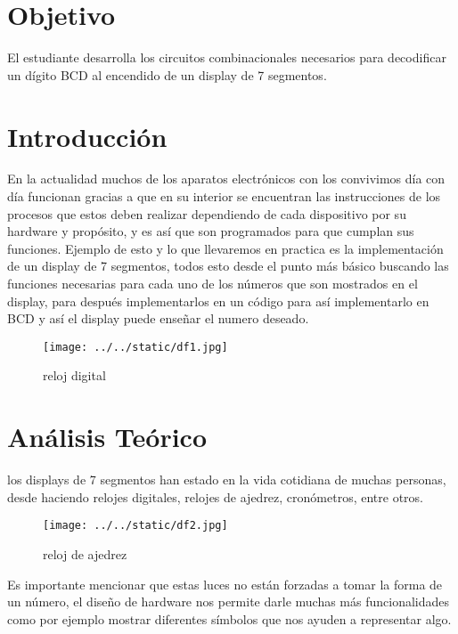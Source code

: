\documentclass{article}
\begin{document}
\begin{abstract}
	\begin{justify}
		Se programo un display de 7 segmentos en una tarjeta de desarrollo FPGADE10 para que nos mostrase los números decimales siendo los inputs (entradas) los switches que se tienen en la tarjeta de tal manera que representen los numeros binarios y la traducción de estos queden plasmados en el display de 7 segmentos.	
		\end{justify}
{\it Keywords:}   diseño de hardware, display de siete segmentos  
\end{abstract}
\begin{multicols}{2}
\section{Objetivo}\label{Objetivo}
El estudiante desarrolla los circuitos combinacionales necesarios para decodificar un dígito BCD al encendido de un display de 7 segmentos.	
\section{Introducción}\label{sec:intro}
En la actualidad muchos de los aparatos electrónicos con los convivimos día con día funcionan gracias a que en su interior se encuentran las instrucciones de los procesos que estos deben realizar dependiendo de cada dispositivo por su hardware y propósito, y es así que son programados para que cumplan sus funciones. Ejemplo de esto y lo que llevaremos en practica es la implementación de un display de 7 segmentos, todos esto desde el punto más básico buscando las funciones necesarias para cada uno de los números que son mostrados en el display, para después implementarlos en un código para así implementarlo en BCD y así el display puede enseñar el numero deseado.
\begin{figure}[H]
	\centering
	\texttt{[image: ../../static/df1.jpg]}	
	\caption{reloj digital}
	\label{fig:1}
\end{figure}
\section{Análisis Teórico}\label{sec:analiTeorico}
los displays de 7 segmentos han estado en la vida cotidiana de muchas personas, desde haciendo relojes digitales, relojes de ajedrez, cronómetros, entre otros.
\begin{figure}[H]
	\centering
	\texttt{[image: ../../static/df2.jpg]}	
	\caption{reloj de ajedrez}
	\label{fig:2}
\end{figure}
Es importante mencionar que estas luces no están forzadas a tomar la forma de un número, el diseño de hardware nos permite darle muchas más funcionalidades como por ejemplo mostrar diferentes símbolos que nos ayuden a representar algo.

\end{multicols}
\end{document}
